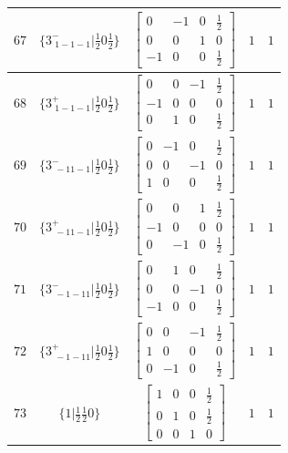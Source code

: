 \documentclass[fleqn,8pt]{jsarticle}
\begin{document}
\begin{longtable}{ccccc}
$ 67 $ & $ \{3^{-}_{\,\,1-1-1}|\frac{1}{2} 0 \frac{1}{2}\} $ & $ \begin{bmatrix} 0 & -1 & 0 & \frac{1}{2} \\ 0 & 0 & 1 & 0 \\ -1 & 0 & 0 & \frac{1}{2} \end{bmatrix} $ & $ 1 $ & $ 1 $ \\ \hline
$ 68 $ & $ \{3^{+}_{\,\,1-1-1}|\frac{1}{2} 0 \frac{1}{2}\} $ & $ \begin{bmatrix} 0 & 0 & -1 & \frac{1}{2} \\ -1 & 0 & 0 & 0 \\ 0 & 1 & 0 & \frac{1}{2} \end{bmatrix} $ & $ 1 $ & $ 1 $ \\ \hline
$ 69 $ & $ \{3^{-}_{\,\,-11-1}|\frac{1}{2} 0 \frac{1}{2}\} $ & $ \begin{bmatrix} 0 & -1 & 0 & \frac{1}{2} \\ 0 & 0 & -1 & 0 \\ 1 & 0 & 0 & \frac{1}{2} \end{bmatrix} $ & $ 1 $ & $ 1 $ \\ \hline
$ 70 $ & $ \{3^{+}_{\,\,-11-1}|\frac{1}{2} 0 \frac{1}{2}\} $ & $ \begin{bmatrix} 0 & 0 & 1 & \frac{1}{2} \\ -1 & 0 & 0 & 0 \\ 0 & -1 & 0 & \frac{1}{2} \end{bmatrix} $ & $ 1 $ & $ 1 $ \\ \hline
$ 71 $ & $ \{3^{-}_{\,\,-1-11}|\frac{1}{2} 0 \frac{1}{2}\} $ & $ \begin{bmatrix} 0 & 1 & 0 & \frac{1}{2} \\ 0 & 0 & -1 & 0 \\ -1 & 0 & 0 & \frac{1}{2} \end{bmatrix} $ & $ 1 $ & $ 1 $ \\ \hline
$ 72 $ & $ \{3^{+}_{\,\,-1-11}|\frac{1}{2} 0 \frac{1}{2}\} $ & $ \begin{bmatrix} 0 & 0 & -1 & \frac{1}{2} \\ 1 & 0 & 0 & 0 \\ 0 & -1 & 0 & \frac{1}{2} \end{bmatrix} $ & $ 1 $ & $ 1 $ \\ \hline
$ 73 $ & $ \{1|\frac{1}{2} \frac{1}{2} 0\} $ & $ \begin{bmatrix} 1 & 0 & 0 & \frac{1}{2} \\ 0 & 1 & 0 & \frac{1}{2} \\ 0 & 0 & 1 & 0 \end{bmatrix} $ & $ 1 $ & $ 1 $ \\ \hline

\end{longtable}
\end{document}
